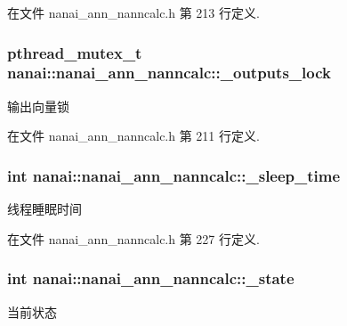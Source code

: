 在文件 nanai\+\_\+ann\+\_\+nanncalc.\+h 第 213 行定义.

\hypertarget{classnanai_1_1nanai__ann__nanncalc_a1c9006356f22904fee12c3635cdc8a15}{}
\subsubsection[{\+\_\+outputs\+\_\+lock}]{\setlength{\rightskip}{0pt plus 5cm}pthread\+\_\+mutex\+\_\+t nanai\+::nanai\+\_\+ann\+\_\+nanncalc\+::\+\_\+outputs\+\_\+lock\hspace{0.3cm}{\ttfamily [protected]}}\label{classnanai_1_1nanai__ann__nanncalc_a1c9006356f22904fee12c3635cdc8a15}
输出向量锁 

在文件 nanai\+\_\+ann\+\_\+nanncalc.\+h 第 211 行定义.

\hypertarget{classnanai_1_1nanai__ann__nanncalc_ad5c0182fd45d65dd7d91439d4eec6119}{}
\subsubsection[{\+\_\+sleep\+\_\+time}]{\setlength{\rightskip}{0pt plus 5cm}int nanai\+::nanai\+\_\+ann\+\_\+nanncalc\+::\+\_\+sleep\+\_\+time\hspace{0.3cm}{\ttfamily [protected]}}\label{classnanai_1_1nanai__ann__nanncalc_ad5c0182fd45d65dd7d91439d4eec6119}
线程睡眠时间 

在文件 nanai\+\_\+ann\+\_\+nanncalc.\+h 第 227 行定义.

\hypertarget{classnanai_1_1nanai__ann__nanncalc_a1b2991833f76b5400e371f01ad7c6bbc}{}
\subsubsection[{\+\_\+state}]{\setlength{\rightskip}{0pt plus 5cm}int nanai\+::nanai\+\_\+ann\+\_\+nanncalc\+::\+\_\+state\hspace{0.3cm}{\ttfamily [protected]}}\label{classnanai_1_1nanai__ann__nanncalc_a1b2991833f76b5400e371f01ad7c6bbc}
当前状态 

